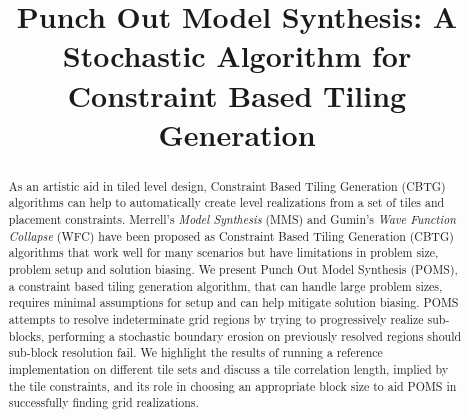 \documentclass[
twocolumn,
]{ceurart}
\begin{document}


\title{ Punch Out Model Synthesis: A Stochastic Algorithm for Constraint Based Tiling Generation}




\begin{abstract}
  As an artistic aid in tiled level design, Constraint Based Tiling Generation (CBTG) algorithms can help
  to automatically create level realizations from a set of tiles and placement constraints.
  Merrell's \textit{Model Synthesis} (MMS) and Gumin's \textit{Wave Function Collapse} (WFC) have been proposed
  as Constraint Based Tiling Generation (CBTG) algorithms that work well for many scenarios but have limitations
  in problem size, problem setup and solution biasing.
  We present Punch Out Model Synthesis (POMS), a constraint based tiling generation algorithm,
  that can handle large problem sizes, requires minimal assumptions
  for setup and can help mitigate solution biasing.
  POMS attempts to resolve indeterminate grid regions by trying to progressively realize sub-blocks, performing a
  stochastic boundary erosion on previously resolved regions should sub-block resolution fail.
  We highlight the results of running a reference implementation on different tile sets and
  discuss a tile correlation length, implied by the tile constraints, and its role in choosing
  an appropriate block size to aid POMS in successfully finding grid realizations.
\end{abstract}

\maketitle









%


\appendix

\end{document}
